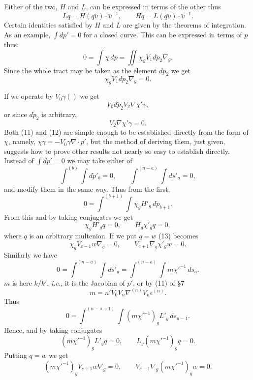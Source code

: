 \documentclass[11pt]{article}
\begin{document}
\indent Either of the two, $H$ and $L$, can be expressed in terms of the other thus
\begin{equation}Lq=H(q\breve{\upsilon})\cdot\breve{\upsilon}^{-1},\qquad Hq=L(q\breve{\upsilon})\cdot\breve{\upsilon}^{-1}.\tag{10}\end{equation}
Certain identities satisfied by $H$ and $L$ are given by the theorems of integration. As an example, $\int dp'=0$ for a closed curve. This can be expressed in terms of $p$ thus:
\[
0=\int\chi\,dp=\iint\chi_gV_1d\breve p_2\nabla_g.
\]
Since the whole tract may be taken as the element $d\breve p_2$ we get
\begin{equation}\chi_gV_1d\breve p_2\nabla_g=0.\tag{11}\end{equation}

If we operate by $V_0\gamma()$ we get
\[
V_0d\breve p_2V_2\nabla\chi'\gamma,
\]
or since $d\breve p_2$ is arbitrary,
\begin{equation}V_2\nabla\chi'\gamma=0.\tag{12}\end{equation}
Both (11) and (12) are simple enough to be established directly from the form of $\chi$, namely, $\chi\gamma=-V_0\gamma\nabla\cdot p'$, but the method of deriving them, just given, suggests how to prove other results not nearly so easy to establish directly. Instead of $\int dp'=0$ we may take either of
\[
\int^{(b)}\!\int d\breve p'_b=0,\qquad
\int^{(n-a)}\!\int ds'_a=0,
\]
and modify them in the same way. Thus from the first,
\[
0=\int^{(b+1)}\!\int\chi_gH'_g\,d\breve p_{b+1}.
\]
From this and by taking conjugates we get
\begin{equation}\chi_gH'_gq=0,\qquad H_g\chi'_gq=0,\tag{13}\end{equation}
where $q$ is an arbitrary multenion. If we put $q=w$ (13) becomes
\begin{equation}\chi_gV_{c-1}w\nabla_g=0,\qquad V_{c+1}\nabla_g\chi'_gw=0.\tag{14}\end{equation}
Similarly we have
\[
0=\int^{(n-a)}\!\int ds'_a
 =\int^{(n-a)}\!\int m\chi'^{-1}\,ds_a.
\]
$m$ is here $k/k'$, \emph{i.e.}, it is the Jacobian of $p'$, or by (11) of §7
\[
m=n'V_0V_n\nabla^{(n)}V_n\epsilon^{(n)}.
\]
Thus
\[
0=\int^{(n-a+1)}\!\int(m\chi'^{-1})_gL'_g\,ds_{a-1}.
\]
Hence, and by taking conjugates
\begin{equation}(m\chi'^{-1})_gL'_gq=0,\qquad L_g(m\chi'^{-1})_gq=0.\tag{15}\end{equation}
Putting $q=w$ we get
\begin{equation}(m\chi'^{-1})_gV_{c+1}w\nabla_g=0,\qquad V_{c-1}\nabla_g(m\chi'^{-1})_gw=0.\tag{16}\end{equation}
\end{document}
